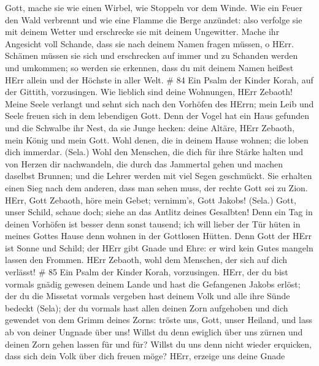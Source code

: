  Gott, mache sie wie einen Wirbel, wie Stoppeln vor dem
Winde.  Wie ein Feuer den Wald verbrennt und wie eine
Flamme die Berge anzündet:  also verfolge sie mit deinem
Wetter und erschrecke sie mit deinem Ungewitter.  Mache ihr
Angesicht voll Schande, dass sie nach deinem Namen fragen müssen, o
HErr.  Schämen müssen sie sich und erschrecken auf immer
und zu Schanden werden und umkommen;  so werden sie
erkennen, dass du mit deinem Namen heißest HErr allein und der Höchste
in aller Welt. \# 84  Ein Psalm der Kinder Korah, auf der
Gittith, vorzusingen.  Wie lieblich sind deine Wohnungen,
HErr Zebaoth!  Meine Seele verlangt und sehnt sich nach den
Vorhöfen des HErrn; mein Leib und Seele freuen sich in dem lebendigen
Gott.  Denn der Vogel hat ein Haus gefunden und die Schwalbe
ihr Nest, da sie Junge hecken: deine Altäre, HErr Zebaoth, mein König
und mein Gott.  Wohl denen, die in deinem Hause wohnen; die
loben dich immerdar. (Sela.)  Wohl den Menschen, die dich
für ihre Stärke halten und von Herzen dir nachwandeln,  die
durch das Jammertal gehen und machen daselbst Brunnen; und die Lehrer
werden mit viel Segen geschmückt.  Sie erhalten einen Sieg
nach dem anderen, dass man sehen muss, der rechte Gott sei zu Zion.
 HErr, Gott Zebaoth, höre mein Gebet; vernimm's, Gott
Jakobs! (Sela.)  Gott, unser Schild, schaue doch; siehe an
das Antlitz deines Gesalbten!  Denn ein Tag in deinen
Vorhöfen ist besser denn sonst tausend; ich will lieber der Tür hüten in
meines Gottes Hause denn wohnen in der Gottlosen Hütten. 
Denn Gott der HErr ist Sonne und Schild; der HErr gibt Gnade und Ehre:
er wird kein Gutes mangeln lassen den Frommen.  HErr
Zebaoth, wohl dem Menschen, der sich auf dich verlässt! \# 85
 Ein Psalm der Kinder Korah, vorzusingen.  HErr,
der du bist vormals gnädig gewesen deinem Lande und hast die Gefangenen
Jakobs erlöst;  der du die Missetat vormals vergeben hast
deinem Volk und alle ihre Sünde bedeckt (Sela);  der du
vormals hast allen deinen Zorn aufgehoben und dich gewendet von dem
Grimm deines Zorns:  tröste uns, Gott, unser Heiland, und
lass ab von deiner Ungnade über uns!  Willst du denn
ewiglich über uns zürnen und deinen Zorn gehen lassen für und für?
 Willst du uns denn nicht wieder erquicken, dass sich dein
Volk über dich freuen möge?  HErr, erzeige uns deine Gnade
